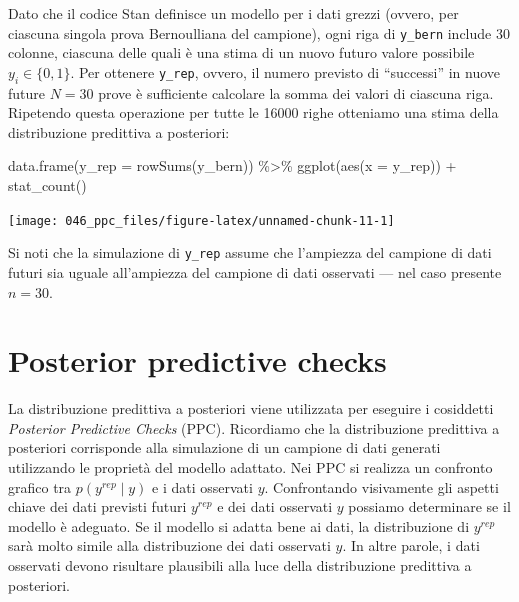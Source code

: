 \documentclass[
  10pt,
  italian,
  a4paper,
  extrafontsizes,onecolumn,openright
  ]{memoir}
\newenvironment{Shaded}{\begin{snugshade}}{\end{snugshade}}
\newcommand{\AttributeTok}[1]{\textcolor[rgb]{0.77,0.63,0.00}{#1}}
\newcommand{\FunctionTok}[1]{\textcolor[rgb]{0.00,0.00,0.00}{#1}}
\newcommand{\NormalTok}[1]{#1}
\newcommand{\SpecialCharTok}[1]{\textcolor[rgb]{0.00,0.00,0.00}{#1}}
\begin{document}
Dato che il codice Stan definisce un modello per i dati grezzi (ovvero, per ciascuna singola prova Bernoulliana del campione), ogni riga di \texttt{y\_bern} include 30 colonne, ciascuna delle quali è una stima di un nuovo futuro valore possibile \(y_i \in \{0, 1\}\). Per ottenere \texttt{y\_rep}, ovvero, il numero previsto di ``successi'' in nuove future \(N = 30\) prove è sufficiente calcolare la somma dei valori di ciascuna riga. Ripetendo questa operazione per tutte le 16000 righe otteniamo una stima della distribuzione predittiva a posteriori:

\begin{Shaded}
\begin{Highlighting}[]
\FunctionTok{data.frame}\NormalTok{(}\AttributeTok{y\_rep =} \FunctionTok{rowSums}\NormalTok{(y\_bern)) }\SpecialCharTok{\%\textgreater{}\%} 
  \FunctionTok{ggplot}\NormalTok{(}\FunctionTok{aes}\NormalTok{(}\AttributeTok{x =}\NormalTok{ y\_rep)) }\SpecialCharTok{+} 
  \FunctionTok{stat\_count}\NormalTok{()}
\end{Highlighting}
\end{Shaded}

\begin{center}\texttt{[image: 046\_ppc\_files/figure-latex/unnamed-chunk-11-1]} \end{center}

Si noti che la simulazione di \texttt{y\_rep} assume che l'ampiezza del campione di dati futuri sia uguale all'ampiezza del campione di dati osservati --- nel caso presente \(n = 30\).

\hypertarget{posterior-predictive-checks}{%
\section{Posterior predictive checks}\label{posterior-predictive-checks}}

La distribuzione predittiva a posteriori viene utilizzata per eseguire i cosiddetti \emph{Posterior Predictive Checks} (PPC). Ricordiamo che la distribuzione predittiva a posteriori corrisponde alla simulazione di un campione di dati generati utilizzando le proprietà del modello adattato. Nei PPC si realizza un confronto grafico tra \(p(y^{rep} \mid y)\) e i dati osservati \(y\).
Confrontando visivamente gli aspetti chiave dei dati previsti futuri \(y^{rep}\) e dei dati osservati \(y\) possiamo determinare se il modello è adeguato. Se il modello si adatta bene ai dati, la distribuzione di \(y^{rep}\) sarà molto simile alla distribuzione dei dati osservati \(y\). In altre parole, i dati osservati devono risultare plausibili alla luce della distribuzione predittiva a posteriori.
\end{document}
